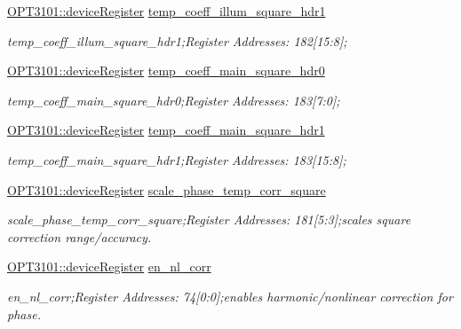 \begin{DoxyCompactItemize}
\mbox{\hyperlink{class_o_p_t3101_1_1device_register}{O\+P\+T3101\+::device\+Register}} \mbox{\hyperlink{class_o_p_t3101_1_1registers_a46159e2f1912ecb2c4a0ebd69600adec}{temp\+\_\+coeff\+\_\+illum\+\_\+square\+\_\+hdr1}}
\begin{DoxyCompactList}\small\item\em temp\+\_\+coeff\+\_\+illum\+\_\+square\+\_\+hdr1;Register Addresses\+: 182\mbox{[}15\+:8\mbox{]}; \end{DoxyCompactList}\item 
\mbox{\hyperlink{class_o_p_t3101_1_1device_register}{O\+P\+T3101\+::device\+Register}} \mbox{\hyperlink{class_o_p_t3101_1_1registers_a0798dc0d4aa811871f1c69208b2774ef}{temp\+\_\+coeff\+\_\+main\+\_\+square\+\_\+hdr0}}
\begin{DoxyCompactList}\small\item\em temp\+\_\+coeff\+\_\+main\+\_\+square\+\_\+hdr0;Register Addresses\+: 183\mbox{[}7\+:0\mbox{]}; \end{DoxyCompactList}\item 
\mbox{\hyperlink{class_o_p_t3101_1_1device_register}{O\+P\+T3101\+::device\+Register}} \mbox{\hyperlink{class_o_p_t3101_1_1registers_a12d86592df5e69945fb4a2571b18f4ec}{temp\+\_\+coeff\+\_\+main\+\_\+square\+\_\+hdr1}}
\begin{DoxyCompactList}\small\item\em temp\+\_\+coeff\+\_\+main\+\_\+square\+\_\+hdr1;Register Addresses\+: 183\mbox{[}15\+:8\mbox{]}; \end{DoxyCompactList}\item 
\mbox{\hyperlink{class_o_p_t3101_1_1device_register}{O\+P\+T3101\+::device\+Register}} \mbox{\hyperlink{class_o_p_t3101_1_1registers_aa08e058cdd46d26b6321687bcc62aab7}{scale\+\_\+phase\+\_\+temp\+\_\+corr\+\_\+square}}
\begin{DoxyCompactList}\small\item\em scale\+\_\+phase\+\_\+temp\+\_\+corr\+\_\+square;Register Addresses\+: 181\mbox{[}5\+:3\mbox{]};scales square correction range/accuracy. \end{DoxyCompactList}\item 
\mbox{\hyperlink{class_o_p_t3101_1_1device_register}{O\+P\+T3101\+::device\+Register}} \mbox{\hyperlink{class_o_p_t3101_1_1registers_a280b2058efcda6af421ff2b96e0f576a}{en\+\_\+nl\+\_\+corr}}
\begin{DoxyCompactList}\small\item\em en\+\_\+nl\+\_\+corr;Register Addresses\+: 74\mbox{[}0\+:0\mbox{]};enables harmonic/nonlinear correction for phase. \end{DoxyCompactList}\item 

\end{DoxyCompactItemize}
